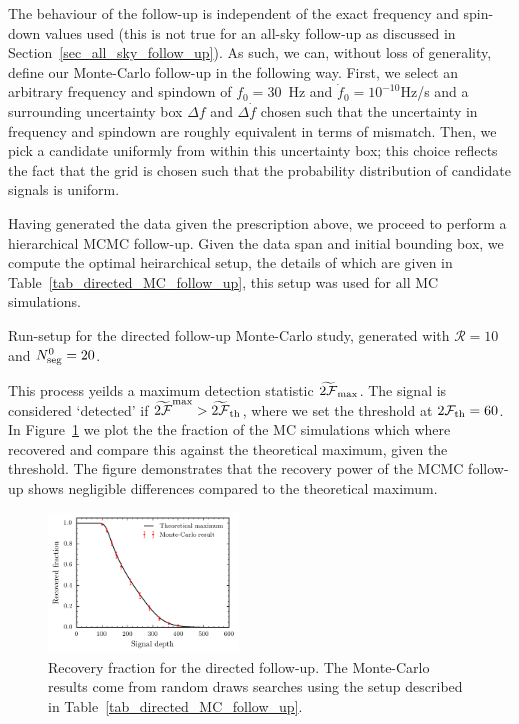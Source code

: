 \documentclass[aps, prd, twocolumn, superscriptaddress, floatfix, showpacs, nofootinbib, longbibliography]{revtex4-1}
\begin{document}
The behaviour of the follow-up is independent of the exact frequency and
spin-down values used (this is not true for an all-sky follow-up as discussed
in Section~\ref{sec_all_sky_follow_up}). As such, we can, without loss of
generality, define our Monte-Carlo follow-up in the following way. First, we
select an arbitrary frequency and spindown of $f_0=30$~Hz and
$\dot{f}_0=10^{-10}$Hz/s and a surrounding uncertainty box $\Delta f$ and
$\Delta \dot{f}$ chosen such that the uncertainty in frequency and spindown are
roughly equivalent in terms of mismatch. Then, we pick a candidate uniformly
from within this uncertainty box; this choice reflects the fact that the grid
is chosen such that the probability distribution of candidate signals is
uniform.

Having generated the data given the prescription above, we proceed to perform a
hierarchical MCMC follow-up. Given the data span and initial bounding box, we
compute the optimal heirarchical setup, the details of which are given in
Table~\ref{tab_directed_MC_follow_up}, this setup was used for all MC
simulations.

\begin{table}[htb]
\caption{Run-setup for the directed follow-up Monte-Carlo study, generated with
$\mathcal{R}=10$ and $N_{\rm seg}^0=20$.}
\label{tab_directed_MC_follow_up}

\end{table}

This process yeilds a maximum detection statistic $\widetilde{2{\mathcal{F}}}_{\rm max}$.
The signal is considered `detected' if $\widetilde{2{\mathcal{F}}}^{\rm max} >
\widetilde{2{\mathcal{F}}}_{\rm th}$, where we set the threshold at $2{\mathcal{F}}_{\rm th}=60$. In
Figure~\ref{fig_directed_MC_follow_up} we plot the the fraction of the MC
simulations which where recovered and compare this against the theoretical
maximum, given the threshold. The figure demonstrates that the recovery power
of the MCMC follow-up shows negligible differences compared to the
theoretical maximum.

\begin{figure}[htb]
\centering
\includegraphics[width=0.45\textwidth]{directed_recovery}
\caption{Recovery fraction for the directed follow-up. The Monte-Carlo results
come from random draws searches using the setup described in
Table~\ref{tab_directed_MC_follow_up}.}
\label{fig_directed_MC_follow_up}
\end{figure}
\end{document}
